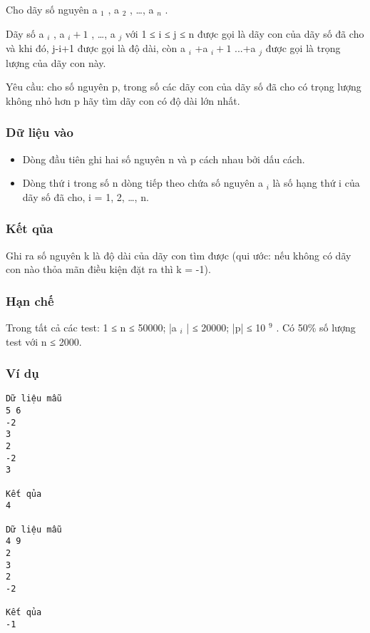 



   Cho dãy số nguyên a   $_    1   $   , a   $_    2   $   , …, a   $_    n   $   .  

   Dãy số a   $_    i   $   , a   $_    i+1   $   , …, a   $_    j   $   với 1 ≤ i ≤ j ≤ n được gọi là dãy con của dãy số đã cho và khi đó, j-i+1 được gọi là độ dài, còn   a   $_    i   $   +a   $_    i+1   $   ...+a   $_    j   $   được gọi là trọng lượng của dãy con này.  

   Yêu cầu: cho số nguyên p, trong số các dãy con của dãy số đã cho có trọng lượng không nhỏ hơn p hãy tìm dãy con có độ dài lớn nhất.  

\subsubsection{   Dữ liệu vào  }
\begin{itemize}
	\item     Dòng đầu tiên ghi hai số nguyên n và p cách nhau bởi dấu cách.   
	\item     Dòng thứ i trong số n dòng tiếp theo chứa số nguyên a    $_     i    $    là số hạng thứ i của dãy số đã  cho, i = 1, 2, …, n.   
\end{itemize}

\subsubsection{   Kết qủa  }

   Ghi ra số nguyên k là độ dài của dãy con tìm được (qui ước: nếu không có dãy con nào thỏa mãn điều kiện đặt ra thì k = -1).  

\subsubsection{   Hạn chế  }

   Trong tất cả các test: 1 ≤ n ≤ 50000;  |a   $_    i   $   | ≤ 20000; |p| ≤ 10   $^    9   $   . Có 50\% số lượng test với n ≤ 2000.  

\subsubsection{   Ví dụ  }
\begin{verbatim}
Dữ liệu mẫu
5 6
-2
3
2
-2
3

Kết qủa
4

Dữ liệu mẫu
4 9
2
3
2
-2

Kết qủa
-1
\end{verbatim}
